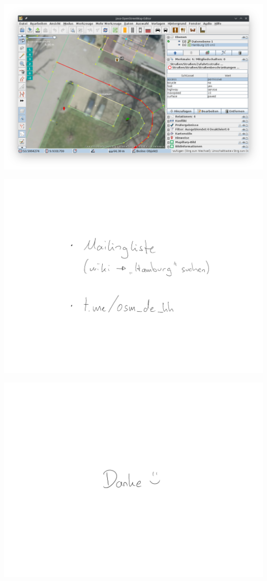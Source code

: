\documentclass{beamer}
\begin{document}
	\begin{frame}
		\vfill
		\vspace{0.5cm}
		\hspace*{-1.2cm}
		\includegraphics[width=1.2\linewidth]{images/ikum-josm}
		\vfill
	\end{frame}

	\begin{frame}
		\begin{center}
			\includegraphics[width=\linewidth]{images/contact}
		\end{center}
	\end{frame}

	\begin{frame}
		\begin{center}
			\includegraphics[width=\linewidth]{images/danke}
		\end{center}
	\end{frame}
\end{document}
